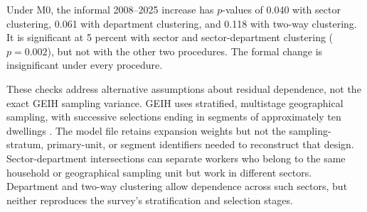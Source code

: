 Under M0, the informal 2008--2025 increase has \(p\)-values of 0.040 with sector
clustering, 0.061 with department clustering, and 0.118 with two-way
clustering. It is significant at 5 percent with sector and sector-department
clustering (\(p=0.002\)), but not with the other two procedures.
The formal change is insignificant under every procedure.

These checks address alternative assumptions about residual dependence,
not the exact GEIH sampling variance. GEIH uses stratified, multistage
geographical sampling, with successive selections ending in segments of
approximately ten dwellings \citep{DANE2008GEIHDesign,DANE2025GEIHDesign}.
The model file retains expansion weights but not the sampling-stratum,
primary-unit, or segment identifiers needed to reconstruct that design.
Sector-department intersections can separate workers who belong to the
same household or geographical sampling unit but work in different sectors.
Department and two-way clustering allow dependence across such sectors,
but neither reproduces the survey's stratification and selection stages.


% 
\FloatBarrier
